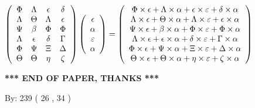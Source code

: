 \documentclass[12pt]{article}
\begin{document}
$  %
 \left( \begin{array}
 {
 c
 c
 c
 c
 }
 \Phi & 
 \Lambda & 
 \epsilon & 
 \delta \\ 
 \Lambda & 
 \Theta & 
 \Lambda & 
 \epsilon \\ 
 \Psi & 
 \beta & 
 \Phi & 
 \Phi \\ 
 \Lambda & 
 \epsilon & 
 \delta & 
 \Gamma \\ 
 \Phi & 
 \Psi & 
                    \Xi & 
 \Delta \\ 
 \Theta & 
 \Theta & 
 \eta & 
                    \zeta
 \end{array} \right)
 \left( \begin{array}
 {
 c
 }
 \epsilon \\ 
 \alpha \\ 
 \varepsilon \\ 
 \alpha
 \end{array} \right)
=
  \left( \begin{array}
 {
 c
 }
 \Phi \times  \epsilon   +  \Lambda \times  \alpha   +  \epsilon \times  \varepsilon   +  \delta \times  \alpha \\ 
 \Lambda \times  \epsilon   +  \Theta \times  \alpha   +  \Lambda \times  \varepsilon   +  \epsilon \times  \alpha \\ 
 \Psi \times  \epsilon   +  \beta \times  \alpha   +  \Phi \times  \varepsilon   +  \Phi \times  \alpha \\ 
 \Lambda \times  \epsilon   +  \epsilon \times  \alpha   +  \delta \times  \varepsilon   +  \Gamma \times  \alpha \\ 
 \Phi \times  \epsilon   +  \Psi \times  \alpha   +                     \Xi \times  \varepsilon   +  \Delta \times  \alpha \\ 
 \Theta \times  \epsilon   +  \Theta \times  \alpha   +  \eta \times  \varepsilon   +                     \zeta \times  \alpha
 \end{array} \right)
$
 
 
 
   
   
 \vspace{0.2in}
 
   
   
   
   
\vspace{1.0in} 
{\textbf{\large{ *** END OF PAPER, THANKS *** }}} 
   
   
\hspace{1.0in} By: 
 239 ( 26 ,  34 )
   
\end{document}
